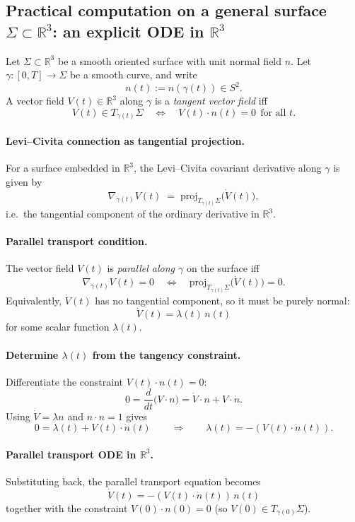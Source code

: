 \documentclass[12pt,a4paper]{article}
\theoremstyle{plain}
\theoremstyle{definition}      %
\begin{document}
	\subsection*{Practical computation on a general surface $\Sigma \subset \mathbb{R}^3$: an explicit ODE in $\mathbb{R}^3$}
	
	Let $\Sigma \subset \mathbb{R}^3$ be a smooth oriented surface with unit normal field $n$.
	Let $\gamma:[0,T]\to \Sigma$ be a smooth curve, and write
	\[
	n(t):=n(\gamma(t)) \in S^2.
	\]
	A vector field $V(t)\in\mathbb{R}^3$ along $\gamma$ is a \emph{tangent vector field} iff
	\[
	V(t)\in T_{\gamma(t)}\Sigma
	\quad\Longleftrightarrow\quad
	V(t)\cdot n(t)=0 \ \ \text{for all }t.
	\]
	
	\paragraph{Levi--Civita connection as tangential projection.}
	For a surface embedded in $\mathbb{R}^3$, the Levi--Civita covariant derivative along $\gamma$ is given by
	\[
	\nabla_{\dot\gamma(t)}V(t) \;=\; \mathrm{proj}_{T_{\gamma(t)}\Sigma}\big(\dot V(t)\big),
	\]
	i.e.\ the tangential component of the ordinary derivative in $\mathbb{R}^3$.
	
	\paragraph{Parallel transport condition.}
	The vector field $V(t)$ is \emph{parallel along $\gamma$} on the surface iff
	\[
	\nabla_{\dot\gamma(t)}V(t)=0
	\quad\Longleftrightarrow\quad
	\mathrm{proj}_{T_{\gamma(t)}\Sigma}\big(\dot V(t)\big)=0.
	\]
	Equivalently, $\dot V(t)$ has no tangential component, so it must be purely normal:
	\[
	\dot V(t)=\lambda(t)\,n(t)
	\]
	for some scalar function $\lambda(t)$.
	
	\paragraph{Determine $\lambda(t)$ from the tangency constraint.}
	Differentiate the constraint $V(t)\cdot n(t)=0$:
	\[
	0=\frac{d}{dt}\big(V\cdot n\big)=\dot V\cdot n + V\cdot \dot n.
	\]
	Using $\dot V=\lambda n$ and $n\cdot n=1$ gives
	\[
	0=\lambda(t) + V(t)\cdot \dot n(t)
	\qquad\Longrightarrow\qquad
	\lambda(t)=-(V(t)\cdot \dot n(t)).
	\]
	
	\paragraph{Parallel transport ODE in $\mathbb{R}^3$.}
	Substituting back, the parallel transport equation becomes
	\[
	\boxed{\ \dot V(t)=-(V(t)\cdot \dot n(t))\,n(t)\ }
	\]
	together with the constraint $V(0)\cdot n(0)=0$ (so $V(0)\in T_{\gamma(0)}\Sigma$).
	
\end{document}
